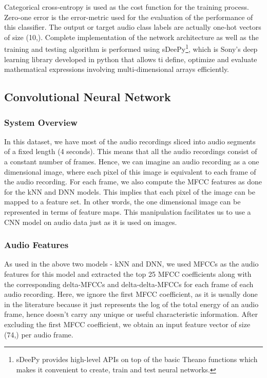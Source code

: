 Categorical cross-entropy is used as the cost function for the training process. Zero-one error is the error-metric used for the evaluation of the performance of this classifier. The output or target audio class labels are actually one-hot vectors of size (10,). Complete implementation of the network architecture as well as the training and testing algorithm is performed using sDeePy\footnote{sDeePy provides high-level APIs on top of the basic Theano functions which makes it convenient to create, train and test neural networks.}, which is Sony's deep learning library developed in python that allows ti define, optimize and evaluate mathematical expressions involving multi-dimensional arrays efficiently.

\subsection{Convolutional Neural Network}

\subsubsection{System Overview} \label{overview_cnn_db1}
In this dataset, we have most of the audio recordings sliced into audio segments of a fixed length (4 seconds). This means that all the audio recordings consist of a constant number of frames. Hence, we can imagine an audio recording as a one dimensional image, where each pixel of this image is equivalent to each frame of the audio recording. For each frame, we also compute the MFCC features as done for the kNN and DNN models. This implies that each pixel of the image can be mapped to a feature set. In other words, the one dimensional image can be represented in terms of feature maps. This manipulation facilitates us to use a CNN model on audio data just as it is used on images.

\subsubsection{Audio Features} \label{features_cnn_db1}
As used in the above two models - kNN and DNN, we used MFCCs as the audio features for this model and extracted the top 25 MFCC coefficients along with the corresponding delta-MFCCs and delta-delta-MFCCs for each frame of each audio recording. Here, we ignore the first MFCC coefficient, as it is usually done in the literature because it just represents the log of the total energy of an audio frame, hence doesn't carry any unique or useful characteristic information. After excluding the first MFCC coefficient, we obtain an input feature vector of size (74,) per audio frame. 

